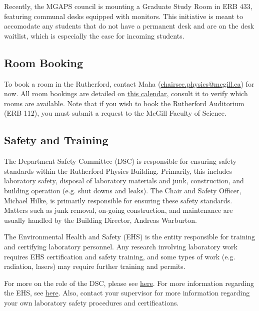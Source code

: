 Recently, the MGAPS council is mounting a Graduate Study Room in ERB 433, featuring communal desks equipped with monitors. This initiative is meant to accomodate any students that do not have a permanent desk and are on the desk waitlist, which is especially the case for incoming students.

\subsection*{Room Booking} 
To book a room in the Rutherford, contact Maha (\href{mailto:chairsec.physics@mcgill.ca}{chairsec.physics@mcgill.ca}) for now. All room bookings are detailed on \href{https://calendar.google.com/calendar/u/0/embed?height=600&wkst=1&bgcolor=%23ffffff&ctz=America/Toronto&src=bG91aXNlLmRlY2VsbGVzQG1jZ2lsbC5jYQ&src=cGh5c2ljc3Jvb21zQGdtYWlsLmNvbQ&color=%23039BE5&color=%23039BE5}{this calendar}, consult it to verify which rooms are available. Note that if you wish to book the Rutherford Auditorium (ERB 112), you must submit a request to the McGill Faculty of Science.

\subsection*{Safety and Training}
The Department Safety Committee (DSC) is responsible for ensuring safety standards within the Rutherford Physics Building. Primarily, this includes laboratory safety, disposal of laboratory materials and junk, construction, and building operation (e.g. shut downs and leaks). The Chair and Safety Officer, Michael Hilke, is primarily responsible for ensuring these safety standards. Matters such as junk removal, on-going construction, and maintenance are usually handled by the Building Director, Andreas Warburton. 

The Environmental Health and Safety (EHS) is the entity responsible for training and certifying laboratory personnel. Any research involving laboratory work requires EHS certification and safety training, and some types of work (e.g. radiation, lasers) may require further training and permits.

For more on the role of the DSC, please see \href{https://www.mcgill.ca/ehs/policies-and-safety-committees/health-and-safety-committees/departmental-safety-committees}
{here}. For more information regarding the EHS, see \href{https://www.mcgill.ca/ehs/training}{here}. Also, contact your supervisor for more information regarding your own laboratory safety procedures and certifications.

